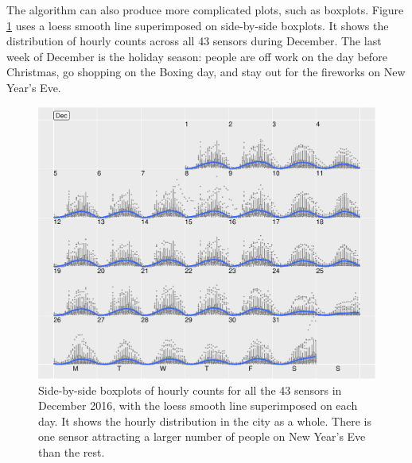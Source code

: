 \documentclass[article]{jss}
\theoremstyle{definition}
\theoremstyle{definition}
\theoremstyle{definition}
\theoremstyle{remark}
\begin{document}
The algorithm can also produce more complicated plots, such as boxplots.
Figure \ref{fig:boxplot} uses a loess smooth line superimposed on
side-by-side boxplots. It shows the distribution of hourly counts across
all 43 sensors during December. The last week of December is the holiday
season: people are off work on the day before Christmas, go shopping on
the Boxing day, and stay out for the fireworks on New Year's Eve.

\begin{CodeChunk}
\begin{figure}

{\centering \includegraphics[width=\textwidth]{figure/boxplot-1} 

}

\caption[Side-by-side boxplots of hourly counts for all the 43
sensors in December 2016, with the loess smooth line superimposed on
each day. It shows the hourly distribution in the city as a whole. There
is one sensor attracting a larger number of people on New Year's Eve
than the rest.]{Side-by-side boxplots of hourly counts for all the 43
sensors in December 2016, with the loess smooth line superimposed on
each day. It shows the hourly distribution in the city as a whole. There
is one sensor attracting a larger number of people on New Year's Eve
than the rest.}\label{fig:boxplot}
\end{figure}
\end{CodeChunk}
\end{document}
